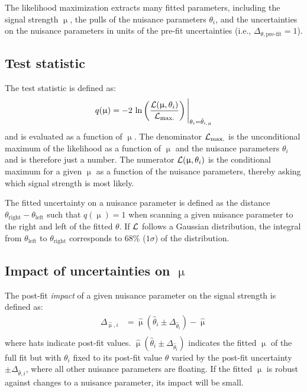 The likelihood maximization extracts many fitted parameters, including the signal strength $\upmu$, the pulls of the nuisance parameters $\theta_i$, and the uncertainties on the nuisance parameters in units of the pre-fit uncertainties (i.e., $\Delta_{\theta,\text{pre-fit}} = 1$).

\subsection{Test statistic}

The test statistic is defined as:
%
\begin{equation}
  \begin{split}
    q(\upmu) &= -2\ \text{ln} \left(\frac{\Lang(\upmu, \theta_i)}{\Lang_\text{max.}}\right) \Bigg\rvert_{\theta_i = \hat{\theta}_{i,\upmu}} \\
  \end{split}
  \label{eqn:test-statistic}
\end{equation}
%
and is evaluated as a function of $\upmu$. The denominator $\mathcal{L}_\text{max.}$ is the unconditional maximum of the likelihood as a function of $\upmu$ and the nuisance parameters $\theta_i$ and is therefore just a number. The numerator $\mathcal{L}(\upmu, \theta_i)$ is the conditional maximum for a given $\upmu$ as a function of the nuisance parameters, thereby asking which signal strength is most likely.

The fitted uncertainty on a nuisance parameter is defined as the distance $\theta_\text{right} - \theta_\text{left}$ such that $q(\upmu) = 1$ when scanning a given nuisance parameter to the right and left of the fitted $\theta$. If $\mathcal{L}$ follows a Gaussian distribution, the integral from $\theta_\text{left}$ to $\theta_\text{right}$ corresponds to 68\% ($1\sigma$) of the distribution.

\subsection{Impact of uncertainties on $\upmu$}

The post-fit \textit{impact} of a given nuisance parameter on the signal strength is defined as:
%
\begin{equation}
  \begin{split}
    \Delta_{\hat{\upmu}, i} &= \hat{\upmu}\left(\hat{\theta}_i \pm \Delta_{\hat{\theta}_i}\right) - \hat{\upmu} \\
  \end{split}
  \label{eqn:impact}
\end{equation}
%
where hats indicate post-fit values. $\hat{\upmu}\left(\hat{\theta}_i \pm \Delta_{\hat{\theta}_i}\right)$ indicates the fitted $\upmu$ of the full fit but with $\theta_i$ fixed to its post-fit value $\hat{\theta}$ varied by the post-fit uncertainty $\pm\Delta_{\hat{\theta}, i}$, where all other nuisance parameters are floating. If the fitted $\upmu$ is robust against changes to a nuisance parameter, its impact will be small.

